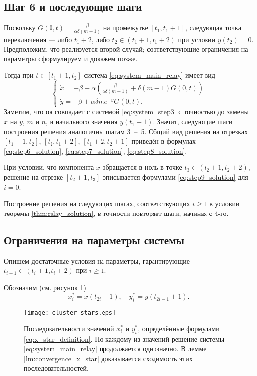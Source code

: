 \subsection{Шаг 6 и последующие шаги}
Поскольку $G(0, t) = \frac{\beta}{\alpha \delta (m - 1)}$ на промежутке $[t_1, t_1 + 1]$, следующая точка переключения --- либо $t_1 + 2$, либо $t_2 \in (t_1 + 1, t_1 + 2)$ при условии $y(t_2) = 0$. Предположим, что реализуется второй случай; соответствующие ограничения на параметры сформулируем и докажем позже.

Тогда при $t \in [t_1 + 1, t_2]$ система \eqref{eq:system_main_relay} имеет вид
%
\begin{equation}
	\label{eq:step6_system}
	\begin{cases}
		\dot{x} = -\beta + \alpha \left(\frac{\beta}{\alpha \delta (m - 1)} + \delta (m - 1) G(0, t)\right)\\
		\dot{y} = -\beta + \alpha \delta m e^{-y} G(0, t).
	\end{cases}
\end{equation}
%
Заметим, что он совпадает с системой \eqref{eq:system_step3} с точностью до замены $x$ на $y$, $m$ и $n$, и начального значения $y(t_1 + 1)$. Значит, следующие шаги построения решения аналогичны шагам 3~--~5. Общий вид решения на отрезках $[t_1 + 1, t_2]$, $[t_2, t_1 + 2]$, $[t_1 + 2, t_2 + 1]$ приведён в формулах \eqref{eq:step6_solution}, \eqref{eq:step7_solution},  \eqref{eq:step8_solution}.

При условии, что компонента $x$ обращается в ноль в точке $t_3 \in (t_2 + 1, t_2 + 2)$, решение на отрезке $[t_2 + 1, t_3]$ описывается формулами \eqref{eq:step9_solution} для $i = 0$.

Построение решения на следующих шагах, соответствующих $i \geqslant 1$ в условии теоремы \ref{thm:relay_solution}, в точности повторяет шаги, начиная с 4-го.

\subsection{Ограничения на параметры системы}
Опишем достаточные условия на параметры, гарантирующие $t_{i + 1} \in (t_i + 1, t_i + 2)$ при $i \geqslant 1$.

Обозначим (см. рисунок \ref{fig:x_star})
\begin{equation}
	\label{eq:x_star_definition}
	x^*_i = x(t_{2i} + 1), \quad y^*_i = y(t_{2i - 1} + 1).
\end{equation}

\begin{figure}
	\centering
	\texttt{[image: cluster\_stars.eps]}
	\caption{Последовательности значений $x^*_i$ и $y^*_i$, определённые формулами \eqref{eq:x_star_definition}. По каждому из значений решение системы \eqref{eq:system_main_relay} продолжается однозначно. В лемме \ref{lm:convergence_x_star} доказывается сходимость этих последовательностей.}
	\label{fig:x_star}
\end{figure}


